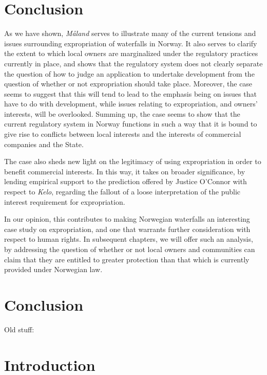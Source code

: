\section{Conclusion}\label{conc}

As we have shown, \emph{Måland} serves to illustrate many of the current tensions and issues surrounding expropriation of waterfalls in Norway. It also serves to clarify the extent to which local owners are 
marginalized under the regulatory practices currently in place, and shows that the regulatory system does not clearly separate the question of how to judge an application to undertake development from the question of whether or not expropriation should take place. Moreover, the case seems to suggest that this will tend to lead to the emphasis being on issues that have to do with development, while issues relating to expropriation, and owners' interests, will be overlooked. Summing up, the case seems to show that the current regulatory system in Norway functions in such a way that it is bound to give rise to conflicts between local interests and the interests of commercial companies and the State.

The case also sheds new light on the legitimacy of using expropriation in order to benefit commercial interests. In this way, it takes on broader significance, by lending empirical support to the prediction offered by Justice O'Connor with respect to \emph{Kelo}, regarding the fallout of a loose interpretation of the public interest requirement for expropriation.

In our opinion, this contributes to making Norwegian waterfalls an interesting case study on expropriation,  and one that warrants further consideration with respect to human rights. In subsequent chapters, we will offer such an analysis, by addressing the question of whether or not local owners and communities can claim that they are entitled to greater protection than that which is currently provided under Norwegian law.

\section{Conclusion}

Old stuff:

\section{Introduction}\label{intro}

